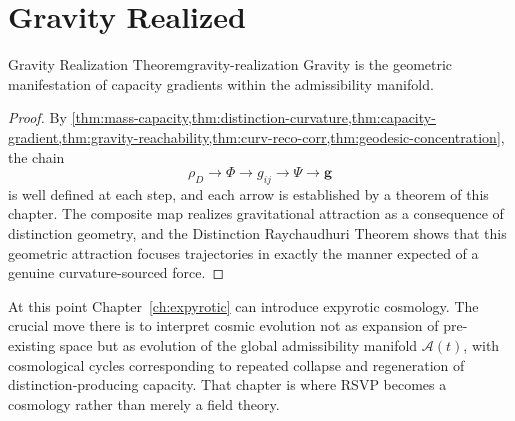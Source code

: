 \documentclass[12pt,twoside,openright]{book}
\begin{document}
\section{Gravity Realized}
\label{sec:ch17-realization}

\begin{theorem}{Gravity Realization Theorem}{gravity-realization}
  Gravity is the geometric manifestation of capacity
  gradients within the admissibility manifold.
\end{theorem}

\begin{proof}
  By \cref{thm:mass-capacity,thm:distinction-curvature,thm:capacity-gradient,thm:gravity-reachability,thm:curv-reco-corr,thm:geodesic-concentration},
  the chain
  \[
    \rho_D \to \Phi \to g_{ij} \to \Psi \to \mathbf{g}
  \]
  is well defined at each step, and each arrow is
  established by a theorem of this chapter. The composite
  map realizes gravitational attraction as a consequence
  of distinction geometry, and the Distinction Raychaudhuri
  Theorem shows that this geometric attraction focuses
  trajectories in exactly the manner expected of a genuine
  curvature-sourced force.
\end{proof}

At this point Chapter~\ref{ch:expyrotic} can introduce
expyrotic cosmology. The crucial move there is to
interpret cosmic evolution not as expansion of pre-existing
space but as evolution of the global admissibility
manifold $\mathcal{A}(t)$, with cosmological cycles
corresponding to repeated collapse and regeneration of
distinction-producing capacity. That chapter is where RSVP
becomes a cosmology rather than merely a field theory.
\end{document}
